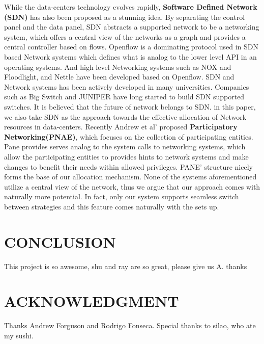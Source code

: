 \documentclass[a4paper,11pt,twocolumn]{article}
\begin{document}
While the data-centers technology evolves rapidly, \textbf{Software Defined Network (SDN)} has also been proposed as a
stunning idea. By separating the control panel and the data panel, SDN   abstracts a supported network to be a networking system, which
offers a central view of the networks as a graph and provides a central controller based on flows.
Openflow is a dominating protocol used in SDN based Network systems which defines what is analog to the lower level API in an operating systems.
And high level Networking systems  such as NOX\cite{nox} and Floodlight\cite{floodlight}, and Nettle\cite{nettle} have been developed based on Openflow. SDN and
Network systems has been actively developed in many universities. Companies such as Big Switch and JUNIPER have long 
started to build SDN supported switches. It is believed that the future of network belongs to SDN. in this paper, we also take SDN as the approach towards the effective allocation of Network resources in data-centers. Recently Andrew et al' proposed 	\textbf{Participatory Networking(PNAE)}\cite{andrew}, 
which focuses on the collection of participating entities.  Pane provides serves    analog to the system calls to networking systems, which 
allow the  participating entities to provides hints to network systems and make changes to benefit their needs within allowed privileges.
PANE' structure  nicely forms the base of our allocation mechanism.  None of the  systems aforementioned utilize a central view of the network, thus we argue that our approach comes with naturally more potential. In  fact, only our system supports seamless switch between strategies and this feature comes naturally with the sets up. 

\section{CONCLUSION}

This project is so awesome, shu and ray are so great, please give us A. thanks

\section{ACKNOWLEDGMENT}
Thanks Andrew Forguson and Rodrigo Fonseca. Special thanks to silao, who ate my sushi.



 
\end{document}
